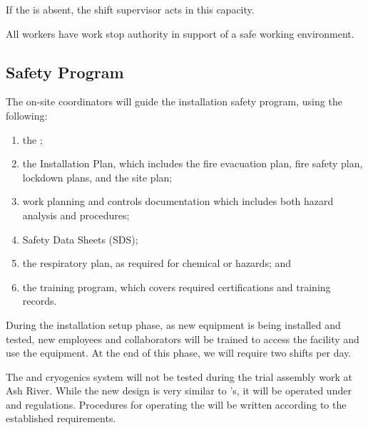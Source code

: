 If the  is absent, the shift supervisor acts in this capacity.

All workers have work stop authority in support of a safe working environment. 

\subsection{Safety Program}

The on-site  coordinators will guide the  installation safety program, using the following:

\begin{enumerate}
\item	the ;
\item the  Installation  Plan, which includes the fire evacuation plan, fire safety plan, lockdown plans, and the site plan;
\item	work planning and controls documentation which includes both hazard analysis and procedures; 
\item	Safety Data Sheets (SDS); 
\item	the respiratory plan, as required for chemical or  hazards; and 
\item	the training program, which covers required certifications and  training records.
\end{enumerate}



During the installation setup phase, as new equipment is being installed and tested, new employees and collaborators will be trained to access the facility and use the equipment. At the end of this phase, we will require two shifts per day.


The \coldbox and cryogenics system will not be 
tested during the trial assembly work at Ash River. 
While the new \coldbox design is very similar to 's, it will be operated under  and  regulations.  Procedures for operating the \coldbox will be written according to the established requirements.



